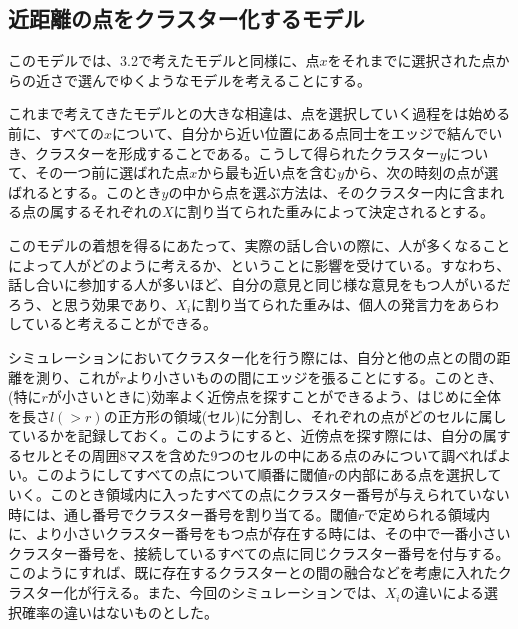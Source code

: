 \subsection{近距離の点をクラスター化するモデル}

このモデルでは、3.2で考えたモデルと同様に、点$x$をそれまでに選択された点からの近さで選んでゆくようなモデルを考えることにする。

これまで考えてきたモデルとの大きな相違は、点を選択していく過程をは始める前に、すべての$x$について、自分から近い位置にある点同士をエッジで結んでいき、クラスターを形成することである。こうして得られたクラスター$y$について、その一つ前に選ばれた点$x$から最も近い点を含む$y$から、次の時刻の点が選ばれるとする。このとき$y$の中から点を選ぶ方法は、そのクラスター内に含まれる点の属するそれぞれの$X$に割り当てられた重みによって決定されるとする。

このモデルの着想を得るにあたって、実際の話し合いの際に、人が多くなることによって人がどのように考えるか、ということに影響を受けている。すなわち、話し合いに参加する人が多いほど、自分の意見と同じ様な意見をもつ人がいるだろう、と思う効果であり、$X_{i}$に割り当てられた重みは、個人の発言力をあらわしていると考えることができる。

シミュレーションにおいてクラスター化を行う際には、自分と他の点との間の距離を測り、これが$r$より小さいものの間にエッジを張ることにする。このとき、(特に$r$が小さいときに)効率よく近傍点を探すことができるよう、はじめに全体を長さ$l(>r)$の正方形の領域(セル)に分割し、それぞれの点がどのセルに属しているかを記録しておく。このようにすると、近傍点を探す際には、自分の属するセルとその周囲8マスを含めた9つのセルの中にある点のみについて調べればよい。このようにしてすべての点について順番に閾値$r$の内部にある点を選択していく。このとき領域内に入ったすべての点にクラスター番号が与えられていない時には、通し番号でクラスター番号を割り当てる。閾値$r$で定められる領域内に、より小さいクラスター番号をもつ点が存在する時には、その中で一番小さいクラスター番号を、接続しているすべての点に同じクラスター番号を付与する。このようにすれば、既に存在するクラスターとの間の融合などを考慮に入れたクラスター化が行える。また、今回のシミュレーションでは、$X_{i}$の違いによる選択確率の違いはないものとした。

